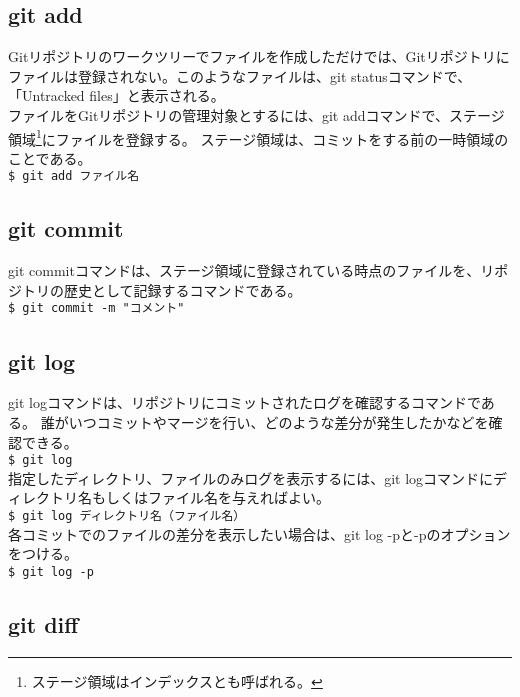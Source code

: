 \documentclass[11pt, oneside]{article}   	%
\begin{document}
\subsection{git add}
Gitリポジトリのワークツリーでファイルを作成しただけでは、Gitリポジトリにファイルは登録されない。このようなファイルは、git statusコマンドで、「Untracked files」と表示される。\\
ファイルをGitリポジトリの管理対象とするには、git addコマンドで、ステージ領域\footnote{ステージ領域はインデックスとも呼ばれる。}にファイルを登録する。
ステージ領域は、コミットをする前の一時領域のことである。\\
\verb|$ git add ファイル名|\\

\subsection{git commit}
git commitコマンドは、ステージ領域に登録されている時点のファイルを、リポジトリの歴史として記録するコマンドである。\\
\verb|$ git commit -m "コメント"|\\

\subsection{git log}
git logコマンドは、リポジトリにコミットされたログを確認するコマンドである。
誰がいつコミットやマージを行い、どのような差分が発生したかなどを確認できる。\\
\verb|$ git log|\\

指定したディレクトリ、ファイルのみログを表示するには、git logコマンドにディレクトリ名もしくはファイル名を与えればよい。\\
\verb|$ git log ディレクトリ名（ファイル名）|\\

各コミットでのファイルの差分を表示したい場合は、git log -pと-pのオプションをつける。\\
\verb|$ git log -p|\\

\subsection{git diff}
\end{document}
